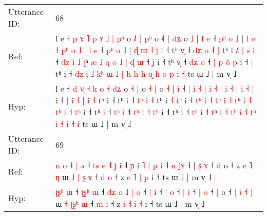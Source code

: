 \documentclass[10pt]{article}
\DeclareRobustCommand{\hl}[1]{{\textcolor{red}{#1}}}
\begin{document}
\begin{longtable}{ll}
 \\
\midrule
Utterance ID: & 68 \\
Ref: & l e ˧ \hl{p} \hl{ɤ}\hl{ }\hl{˥} \hl{p} \hl{ɤ} \hl{˩} \hl{|} \hl{p}\hl{ʰ} o \hl{˩}\hl{˥} |\hl{ }\hl{p}\hl{ʰ} o \hl{˩}\hl{˥} |\hl{ }\hl{d}\hl{ʑ} o \hl{˩} |\hl{ }\hl{l} \hl{e} ˧ \hl{p}\hl{ʰ} \hl{o} \hl{˩} | \hl{l} \hl{e} \hl{˧} \hl{}\hl{p}\hl{ʰ} \hl{o} \hl{˩} \hl{|} \hl{l} \hl{e} ˧ \hl{p}\hl{ʰ} \hl{o} \hl{˩} | \hl{ɖ} \hl{ɯ} \hl{˧}\hl{ }\hl{ʝ} i ˧ tʰ \hl{v}\hl{̩} ˧ \hl{d}\hl{ʑ} \hl{o} ˧\hl{ }\hl{|} tʰ i \hl{˩}\hl{˥} \hl{|}\hl{ }\hl{s} i ˧ \hl{d}\hl{z} i \hl{˩} \hl{ʈ}ʰ \hl{æ} \hl{˩} \hl{}\hl{q} \hl{o} \hl{˩} \hl{|}\hl{ }\hl{ɖ} \hl{ɯ} ˧ \hl{}\hl{ʝ} i ˧ tʰ \hl{v}\hl{̩} ˧ \hl{d}\hl{ʑ} \hl{o} ˧ \hl{}\hl{|} \hl{p} \hl{o}\hl{̃}\hl{ }\hl{p} i ˧\hl{ }\hl{|} tʰ i ˧ \hl{d}\hl{z} i \hl{˩} \hl{k}ʰ \hl{ɯ} \hl{˩} \hl{|}\hl{ }\hl{h} \hl{h} \hl{h} \hl{o}\hl{̥} \hl{h} \hl{o} \hl{p} \hl{i} \hl{˧} ts ɯ ˩ | m v̩ ˩
 \\
Hyp: & l e ˧ \hl{d} \hl{}\hl{v}\hl{̩} \hl{˧} \hl{k} \hl{o} \hl{˧} \hl{d}\hl{ʑ} o \hl{}\hl{˧} |\hl{}\hl{}\hl{} o \hl{}\hl{˧} |\hl{}\hl{}\hl{} o \hl{˧} |\hl{}\hl{} \hl{i} ˧ \hl{}\hl{|} \hl{i} \hl{˧} | \hl{i} \hl{˧} \hl{|} \hl{i}\hl{ }\hl{˧} \hl{|} \hl{i} \hl{˧} \hl{|} \hl{i} ˧ \hl{}\hl{|} \hl{i} \hl{˧} | \hl{i} \hl{˧} \hl{}\hl{t}\hl{ʰ} i ˧ tʰ \hl{}\hl{i} ˧ \hl{t}\hl{ʰ} \hl{i} ˧\hl{}\hl{} tʰ i \hl{}\hl{˧} \hl{}\hl{t}\hl{ʰ} i ˧ \hl{t}\hl{ʰ} i \hl{˧} \hl{t}ʰ \hl{i} \hl{˧} \hl{t}\hl{ʰ} \hl{i} \hl{˧} \hl{}\hl{t}\hl{ʰ} \hl{i} ˧ \hl{t}\hl{ʰ} i ˧ tʰ \hl{}\hl{i} ˧ \hl{t}\hl{ʰ} \hl{i} ˧ \hl{t}\hl{ʰ} \hl{i} \hl{˧}\hl{ }\hl{t}\hl{ʰ} i ˧\hl{}\hl{} tʰ i ˧ \hl{t}\hl{ʰ} i \hl{˧} \hl{t}ʰ \hl{i} \hl{˧} \hl{}\hl{t}\hl{ʰ} \hl{i} \hl{˧} \hl{t}\hl{ʰ} \hl{i} \hl{˧} \hl{i} \hl{˧} \hl{i} ts ɯ ˩ | m v̩ ˩
 \\
\midrule
Utterance ID: & 69 \\
Ref: & \hl{}\hl{}\hl{n} \hl{o} ˧ \hl{}\hl{}\hl{|} \hl{ə} ˧ \hl{t}\hl{s} \hl{e} \hl{˧} \hl{ʝ} \hl{i} ˧ \hl{ɲ} i \hl{˥} |\hl{ }\hl{p} \hl{i} ˧ \hl{n} \hl{j}\hl{ɤ} ˧ |\hl{ }\hl{ʂ} \hl{ɤ} ˧ \hl{d} o ˧ \hl{z} \hl{e} \hl{˥} \hl{ɳ} ɯ \hl{˩} \hl{|}\hl{ }\hl{ʂ} \hl{ɤ} ˧ \hl{d} \hl{o} ˧ z \hl{e} \hl{˥} \hl{|} \hl{p} i ˧ ts ɯ ˩ | m v̩ ˩\hl{ }\hl{|}
 \\
Hyp: & \hl{ʈ}\hl{ʂ}\hl{ʰ} \hl{ɯ} ˧ \hl{ʈ}\hl{ʂ}\hl{ʰ} \hl{ɯ} ˧ \hl{d}\hl{ʑ} \hl{o} \hl{˩} \hl{|} \hl{o} ˧ \hl{|} i \hl{˧} |\hl{}\hl{} \hl{o} ˧ \hl{|} \hl{}\hl{i} ˧ |\hl{}\hl{} \hl{o} ˧ \hl{|} o ˧ \hl{|} \hl{i} \hl{˧} \hl{|} ɯ \hl{˧} \hl{ʈ}\hl{ʂ}\hl{ʰ} \hl{ɯ} ˧ \hl{m} \hl{i} ˧ z \hl{i} \hl{˧} \hl{i} \hl{˧} i ˧ ts ɯ ˩ | m v̩ ˩\hl{}\hl{}
 \\

\end{longtable}
\end{document}
